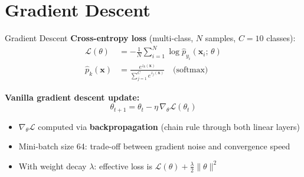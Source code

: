 \documentclass[aspectratio=169,10pt]{beamer}
\begin{document}
\section{Gradient Descent}

\begin{frame}{Gradient Descent}
  \textbf{Cross-entropy loss} (multi-class, $N$ samples, $C=10$ classes):
  \begin{align}
    \mathcal{L}(\theta) &= -\frac{1}{N}\sum_{i=1}^{N} \log \hat{p}_{y_i}(\mathbf{x}_i;\,\theta)
    \tag{1}\\[4pt]
    \hat{p}_k(\mathbf{x}) &= \frac{e^{z_k(\mathbf{x})}}{\displaystyle\sum_{j=1}^{C} e^{z_j(\mathbf{x})}}
    \quad\text{(softmax)}
    \tag{2}
  \end{align}

  \textbf{Vanilla gradient descent update:}
  \begin{equation}
    \theta_{t+1} = \theta_t - \eta\,\nabla_\theta \mathcal{L}(\theta_t)
    \tag{3}
  \end{equation}

  \begin{itemize}
    \item $\nabla_\theta \mathcal{L}$ computed via \textbf{backpropagation} (chain rule through both linear layers)
    \item Mini-batch size 64: trade-off between gradient noise and convergence speed
    \item With weight decay $\lambda$: effective loss is $\mathcal{L}(\theta) + \tfrac{\lambda}{2}\|\theta\|^2$
  \end{itemize}
\end{frame}
\end{document}
